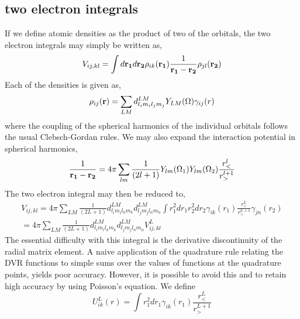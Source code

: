 \documentclass[preprint,showpacs,preprintnumbers,amsmath,amssymb]{revtex4}
\begin{document}
\subsection{two electron integrals}
If we define atomic densities as the product of two of the orbitals, the 
two electron integrals may simply be written as,
\begin{equation}
    V_{ij,kl} = \int d{\bf r_1} d{\bf r_2}  \rho_{ik}({\bf r_1}) 
                   \frac{1}{{\bf r_1} - {\bf r_2} } \rho_{jl}({\bf r_2 }) 
\end{equation}
Each of the densities is given as,
\begin{equation}
 \rho_{ij}({\bf r})  = \sum_{LM} d^{LM}_{l_{i}m_{i}l_{j}m_{j}} 
                                 Y_{LM}(\Omega) 
                       \gamma_{ij}(r) 
\end{equation}
where the coupling of the spherical harmonics of the individual orbitals
follows the usual Clebsch-Gordan rules.  We may also expand the interaction
potential in spherical harmonics,
\begin{equation}
    \frac{1}{{\bf r_1} - {\bf r_2} } = 4 \pi \sum_{lm} \frac{1}{(2l+1)} 
                                    Y_{lm}(\Omega_{1}) Y_{lm}(\Omega_{2}) 
                                      \frac{r_{<}^{l}}{r_{>}^{l+1}}
\end{equation}
The two electron integral may then be reduced to,
\begin{eqnarray}
    V_{ij,kl} = 4 \pi \sum_{LM} \frac{1}{(2L+1)} 
                d^{LM}_{l_{i}m_{i}l_{k}m_{k}} d^{LM}_{l_{j}m_{j}l_{n}m_{n}} 
                  \int r^{2}_{1} dr_1 r^{2}_{2} dr_2
                  \gamma_{ik}(r_1) \frac{r_{<}^{L}}{r_{>}^{L+1}}
                   \gamma_{jn}(r_2)      \\ \nonumber
              = 4 \pi \sum_{LM} \frac{1}{(2L+1)} 
                d^{LM}_{l_{i}m_{i}l_{k}m_{k}} d^{LM}_{l_{j}m_{j}l_{n}m_{n}} 
                V^{L}_{ij,kl}
\end{eqnarray}
The essential difficulty with this integral is the derivative discontinuity
of the radial matrix element.  A naive application of the quadrature rule
relating the DVR functions to simple sums over the values of functions at
the quadrature points, yields poor accuracy.  However, it is possible to 
avoid this and to retain high accuracy by using Poisson's equation.  
We define
\begin{equation}
    U^{L}_{ik}(r) = \int r_{1}^{2} dr_{1} 
                     \gamma_{ik}(r_1) \frac{r_{<}^{L}}{r_{>}^{L+1}}      
\end{equation}
\end{document}
